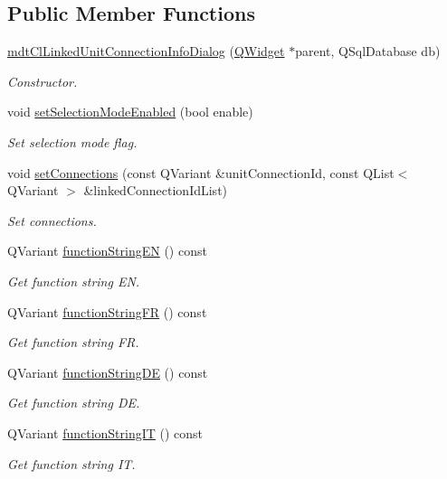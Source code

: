 \subsection*{Public Member Functions}
\begin{DoxyCompactItemize}
\item 
\hyperlink{classmdt_cl_linked_unit_connection_info_dialog_a435b36e611f1aecefe3b9fb8f33d77bc}{mdt\-Cl\-Linked\-Unit\-Connection\-Info\-Dialog} (\hyperlink{class_q_widget}{Q\-Widget} $\ast$parent, Q\-Sql\-Database db)
\begin{DoxyCompactList}\small\item\em Constructor. \end{DoxyCompactList}\item 
void \hyperlink{classmdt_cl_linked_unit_connection_info_dialog_a480970265fe1b2e8cfeee594ee617f64}{set\-Selection\-Mode\-Enabled} (bool enable)
\begin{DoxyCompactList}\small\item\em Set selection mode flag. \end{DoxyCompactList}\item 
void \hyperlink{classmdt_cl_linked_unit_connection_info_dialog_a0174bb7aa7a5c1d3affc965df9d21cba}{set\-Connections} (const Q\-Variant \&unit\-Connection\-Id, const Q\-List$<$ Q\-Variant $>$ \&linked\-Connection\-Id\-List)
\begin{DoxyCompactList}\small\item\em Set connections. \end{DoxyCompactList}\item 
Q\-Variant \hyperlink{classmdt_cl_linked_unit_connection_info_dialog_a2b7b389c4f91ee1f07a1b8befcfd5acb}{function\-String\-E\-N} () const 
\begin{DoxyCompactList}\small\item\em Get function string E\-N. \end{DoxyCompactList}\item 
Q\-Variant \hyperlink{classmdt_cl_linked_unit_connection_info_dialog_aa2a76f39337cef29b506d6bb588b6496}{function\-String\-F\-R} () const 
\begin{DoxyCompactList}\small\item\em Get function string F\-R. \end{DoxyCompactList}\item 
Q\-Variant \hyperlink{classmdt_cl_linked_unit_connection_info_dialog_ab2685a6494d758d7ea4c12e0d53281d6}{function\-String\-D\-E} () const 
\begin{DoxyCompactList}\small\item\em Get function string D\-E. \end{DoxyCompactList}\item 
Q\-Variant \hyperlink{classmdt_cl_linked_unit_connection_info_dialog_a322cc8a65ce3de322066fd6e636b7466}{function\-String\-I\-T} () const 
\begin{DoxyCompactList}\small\item\em Get function string I\-T. \end{DoxyCompactList}\end{DoxyCompactItemize}


